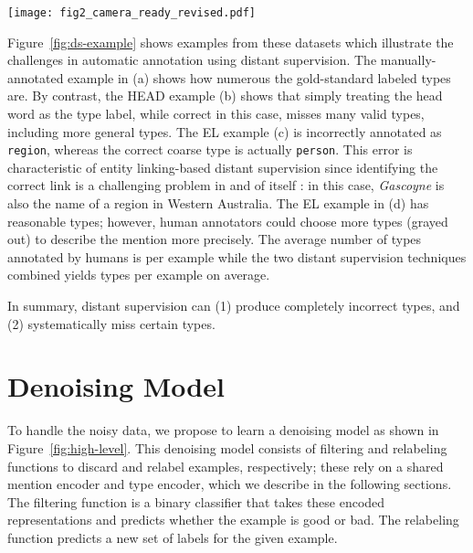 \documentclass[11pt,a4paper]{article}
\begin{document}
\begin{figure*}[t]
\centering
    \centering
    \texttt{[image: fig2\_camera\_ready\_revised.pdf]}
    \caption{Denoising models. The \emph{Filter} model predicts whether the example should be kept at all; if it is kept, the \emph{Relabel} model attempts to automatically expand the label set.  is a mention encoder, which can be a state-of-the-art entity typing model.  encodes noisy types from distant supervision.}
    \label{fig:high-level}
\end{figure*}



Figure~\ref{fig:ds-example} shows examples from these datasets which illustrate the challenges in automatic annotation using distant supervision. The manually-annotated example in (a) shows how numerous the gold-standard labeled types are. By contrast, the HEAD example (b) shows that simply treating the head word as the type label, while correct in this case, misses many valid types, including more general types. The EL example (c) is incorrectly annotated as \texttt{region}, whereas the correct coarse type is actually \texttt{person}. This error is characteristic of entity linking-based distant supervision since identifying the correct link is a challenging problem in and of itself \cite{MilneWitten2008}: in this case, \emph{Gascoyne} is also the name of a region in Western Australia. The EL example in (d) has reasonable types; however, human annotators could choose more types (grayed out) to describe the mention more precisely. The average number of types annotated by humans is  per example while the two distant supervision techniques combined yields  types per example on average. 



In summary, distant supervision can (1) produce completely incorrect types, and (2) systematically miss certain types.





\section{Denoising Model}\label{cdae}

To handle the noisy data, we propose to learn a denoising model as shown in Figure~\ref{fig:high-level}. This denoising model consists of filtering and relabeling functions to discard and relabel examples, respectively; these rely on a shared mention encoder and type encoder, which we describe in the following sections. The filtering function is a binary classifier that takes these encoded representations and predicts whether the example is good or bad. The relabeling function predicts a new set of labels for the given example.
\end{document}
